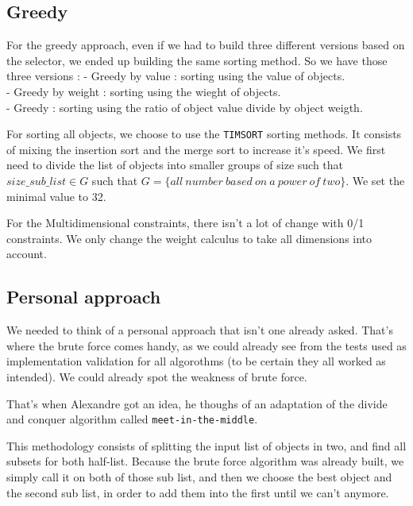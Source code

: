\documentclass[a4paper, 11pt]{article}
\begin{document}
    \subsection{Greedy}

    For the greedy approach, even if we had to build three different versions based on the selector, we ended up building the same sorting method.
    So we have those three versions :
    \tabto{1.5cm} - Greedy by value : sorting using the value of objects.\\
    \tabto{1.5cm} - Greedy by weight : sorting using the wieght of objects.\\
    \tabto{1.5cm} - Greedy : sorting using the ratio of object value divide by object weigth.\par

    For sorting all objects, we choose to use the \verb+TIMSORT+ sorting methods.
    It consists of mixing the insertion sort and the merge sort to increase it's speed. We first need to divide the list of objects into smaller groups of size such that $size\_sub\_list \in G$ such that $G = \{all\ number\ based\ on\ a\ power\ of\ two\}$. We set the minimal value to 32.\par
    
    For the Multidimensional constraints, there isn't a lot of change with 0/1 constraints. We only change the weight calculus to take all dimensions into account.


    \subsection{Personal approach}

    We needed to think of a personal approach that isn't one already asked. That's where the brute force comes handy, as we could already see from the tests used as implementation validation for all algorothms (to be certain they all worked as intended). We could already spot the weakness of brute force.\par
    That's when Alexandre got an idea, he thoughs of an adaptation of the divide and conquer algorithm called \verb+meet-in-the-middle+.\par
    This methodology consists of splitting the input list of objects in two, and find all subsets for both half-list. Because the brute force algorithm was already built, we simply call it on both of those sub list, and then we choose the best object and the second sub list, in order to add them into the first until we can't anymore.
\end{document}
